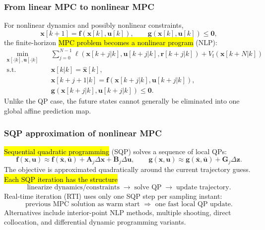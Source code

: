 \begin{frame}
	\frametitle{From linear MPC to nonlinear MPC}
	For nonlinear dynamics and possibly nonlinear constraints,
	\begin{equation}
		\bm{x}[k+1]=\bm{f}(\bm{x}[k],\bm{u}[k]),
		\qquad
		\bm{g}(\bm{x}[k],\bm{u}[k])\leq\bm{0},
	\end{equation}\pause%
	the finite-horizon \hl{MPC problem becomes a nonlinear program} (NLP):
	\begin{equation}
		\boxed{
			\begin{aligned}
				\min_{\bm{x}[\cdot|k],\bm{u}[\cdot|k]}\quad
				 & \sum_{j=0}^{N-1}\ell(\bm{x}[k+j|k],\bm{u}[k+j|k],\bm{r}[k+j|k])
				+V_{\mathrm{f}}(\bm{x}[k+N|k])                                     \\
				\mathrm{s.t.}\quad
				 & \bm{x}[k|k]=\hat{\bm{x}}[k],                                    \\
				 & \bm{x}[k+j+1|k]=\bm{f}(\bm{x}[k+j|k],\bm{u}[k+j|k]),            \\
				 & \bm{g}(\bm{x}[k+j|k],\bm{u}[k+j|k])\leq\bm{0}.
			\end{aligned}}
	\end{equation}\pause%
	Unlike the QP case, the future states cannot generally be eliminated into one global affine prediction map.
\end{frame}

\begin{frame}
	\frametitle{SQP approximation of nonlinear MPC}
	\hl{Sequential quadratic programming} (SQP) solves a sequence of local QPs:
	\begin{equation}
		\bm{f}(\bm{x},\bm{u})\approx
		\bm{f}(\bar{\bm{x}},\bar{\bm{u}})
		+\bm{A}_{j}\Delta\bm{x}+\bm{B}_{j}\Delta\bm{u},
		\qquad
		\bm{g}(\bm{x},\bm{u})\approx
		\bm{g}(\bar{\bm{x}},\bar{\bm{u}})+\bm{G}_{j}\Delta\bm{z}.
	\end{equation}\pause%
	The objective is approximated quadratically around the current trajectory guess. \pause%
	\hl{Each SQP iteration has the structure}
	\begin{equation*}
		\text{linearize dynamics/constraints}
		\;\rightarrow\;
		\text{solve QP}
		\;\rightarrow\;
		\text{update trajectory}.
	\end{equation*}\pause%
	Real-time iteration (RTI) uses only one SQP step per sampling instant:
	\begin{equation*}
		\boxed{\text{previous MPC solution as warm start }\Rightarrow\text{ one fast local QP update}.}
	\end{equation*}\pause%
	Alternatives include interior-point NLP methods, multiple shooting, direct collocation, and differential dynamic programming variants.
\end{frame}

